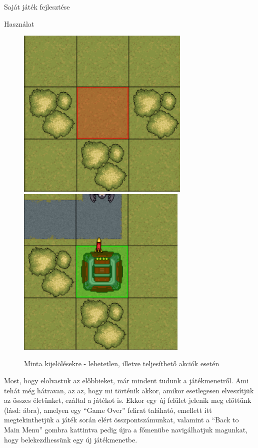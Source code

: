 \begin{MyChapter}{Saját játék fejlesztése}
\begin{MySection}{Használat}
		\begin{figure}[H]
			\centering
			\includegraphics[scale=0.848]{kepek/jatekHasznalat/minta_rossz_kijeloles}
			\includegraphics[scale=0.85]{kepek/jatekHasznalat/minta_jo_kijeloles}
			\caption{Minta kijelölésekre - lehetetlen, illetve teljesíthető akciók esetén}
			\label{fig:jatekHasznalat:kijeloles_minta}
		\end{figure}
		
		
		Most, hogy elolvastuk az előbbieket, már mindent tudunk a játékmenetről. Ami tehát még hátravan, az az, hogy mi történik akkor, amikor esetlegesen elveszítjük az összes életünket, ezáltal a játékot is.
		Ekkor egy új felület jelenik meg előttünk (lásd:  ábra), amelyen egy ``Game Over'' felirat taláható, emellett itt megtekinthetjük a játék során elért összpontszámunkat, valamint a ``Back to Main Menu'' gombra kattintva pedig újra a főmenübe navigálhatjuk magunkat, hogy belekezdhessünk egy új játékmenetbe.
		

\end{MySection}
\end{MyChapter}
